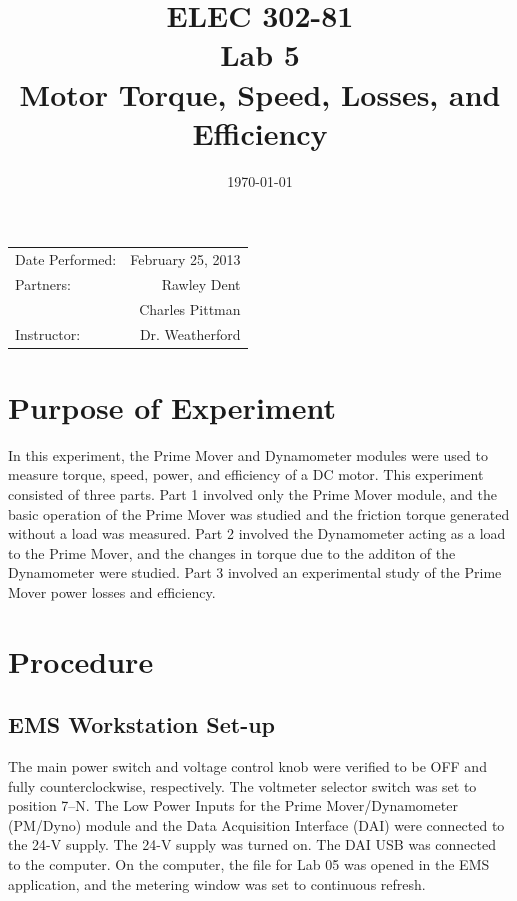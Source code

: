 \documentclass{article}
\author{}
\title{ELEC 302-81\\ Lab 5\\ Motor Torque, Speed, Losses, and Efficiency}
\date{\today}
\begin{document}
\maketitle

\begin{center}
  \begin{tabular}{lr}
    Date Performed: & February 25, 2013 \\
    Partners: & Rawley Dent \\
              & Charles Pittman \\
    Instructor: & Dr. Weatherford
  \end{tabular}
\end{center}

\pagebreak

\setlength\parindent{0pt}

\section{Purpose of Experiment}

In this experiment, the Prime Mover and Dynamometer modules were used to
measure torque, speed, power, and efficiency of a DC motor. This experiment
consisted of three parts. Part 1 involved only the Prime Mover module, and the
basic operation of the Prime Mover was studied and the friction torque
generated without a load was measured. Part 2 involved the Dynamometer acting
as a load to the Prime Mover, and the changes in torque due to the additon of
the Dynamometer were studied. Part 3 involved an experimental study of the
Prime Mover power losses and efficiency.

\section{Procedure}

\subsection{EMS Workstation Set-up}

The main power switch and voltage control knob were verified to be OFF and
fully counterclockwise, respectively. The voltmeter selector switch was set to
position 7--N. The Low Power Inputs for the Prime Mover/Dynamometer (PM/Dyno)
module and the Data Acquisition Interface (DAI) were connected to the 24-V
supply. The 24-V supply was turned on. The DAI USB was connected to the
computer. On the computer, the file for Lab 05 was opened in the EMS
application, and the metering window was set to continuous refresh.
\end{document}
